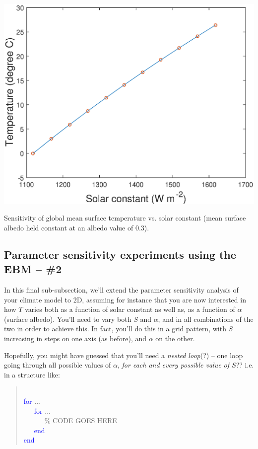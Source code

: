 \documentclass{tufte-book} %
\newenvironment{docspec}{\begin{quotation}\ttfamily\parskip0pt\parindent0pt\ignorespaces}{\end{quotation}}
\begin{document}
\begin{marginfigure}[-0.5in]
\includegraphics[width=\linewidth]{ch8-sens1D.eps}
\caption{Sensitivity of global mean surface temperature vs. solar constant (mean surface albedo held constant at an albedo value of 0.3).}
\label{fig:ch8-sens1D}
\end{marginfigure}

%
\newpage

\subsection{Parameter sensitivity experiments using the EBM -- \#2}

In this final sub-subsection, we'll extend the parameter sensitivity analysis of your climate model to 2D, assuming for instance that you are  now interested in  how \(T\)  varies both as a function of solar constant as well as, as a function of \(\alpha\) (surface albedo). You'll need to vary both \(S\) and \(\alpha\), and in all combinations of the two in order to achieve this. In fact, you'll do this in a grid pattern, with \(S\) increasing in steps on one axis (as before), and \(\alpha\) on the other.

Hopefully, you might have guessed that you'll need a \textit{nested loop}(?) -- one loop going through all possible values of \(\alpha\), \textit{for each and every possible value of \(S\)}?? i.e. in a structure like:
\vspace{-1mm}\begin{docspec}
\\\textcolor{blue}{for} ...
\\ \ \ \ \textcolor{blue}{for} ...
\\ \ \ \ \ \ \ \textcolor[rgb]{0,0.501961,0}{\% CODE GOES HERE}
\\ \ \ \ \textcolor{blue}{end}
\\\textcolor{blue}{end}
\end{docspec}\vspace{-1mm}
\end{document}
